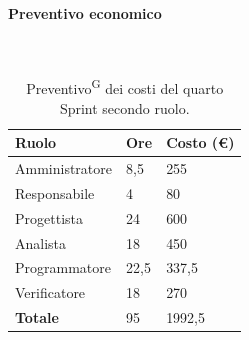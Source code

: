 \documentclass[8pt]{article}
\newcommand{\glossterm}[1]{#1\textsuperscript{G}} %
\newcommand{\subsubsubsection}[1]{\paragraph{#1}\mbox{}\\}
\begin{document}
\subsubsubsection{Preventivo economico}
\begin{table}[ht!]
	\centering
	\begin{tabular}{p{4cm} p{1cm} p{2cm}}
        \toprule
        \textbf{Ruolo} & \textbf{Ore} & \textbf{Costo (€)} \\
        \midrule
        Amministratore & 8,5 & 255 \\
        Responsabile & 4 & 80 \\
        Progettista & 24 & 600 \\
        Analista & 18 & 450 \\
        Programmatore & 22,5 & 337,5 \\
        Verificatore & 18 & 270 \\
        \bottomrule
        \textbf{Totale} & 95 & 1992,5
    \end{tabular}
    \caption{\glossterm{Preventivo} dei costi del quarto Sprint secondo ruolo.}
	\label{table:Preventivo dei costi del quarto Sprint secondo ruolo}
\end{table}
\end{document}
